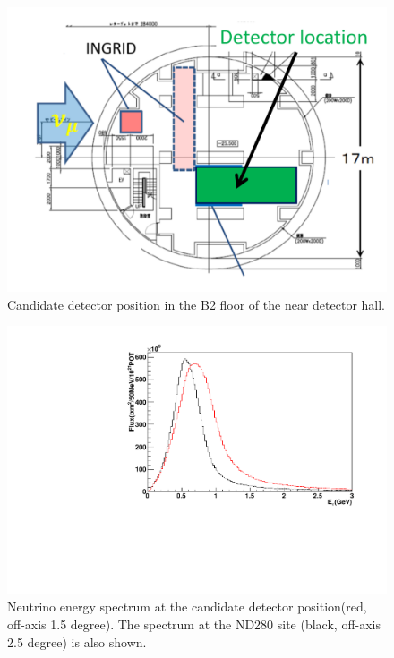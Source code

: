 \begin{figure}[tbhp]
\begin{center}
\includegraphics[width=0.6\linewidth]{fig/detector_position_b2.pdf}
\end{center}
\caption{
Candidate detector position in the B2 floor of the near detector hall.
}
\label{fig:location}
\end{figure}

\begin{figure}[tbhp]
\begin{center}
\includegraphics[width=0.6\linewidth, angle=270]{fig/b2_nd280_fluxes.pdf}
\end{center}
\caption{
Neutrino energy spectrum at the candidate detector position(red, off-axis 1.5 degree).
The spectrum at the ND280 site (black, off-axis 2.5 degree) is also shown.
}
\label{fig:b2flux}
\end{figure}

